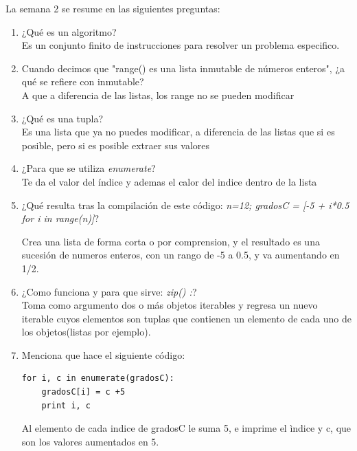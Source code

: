 \documentclass[letterpaper, 12pt, oneside]{article}%
\begin{document}
La semana 2 se resume en las siguientes preguntas:%
\begin{enumerate}%
	\item ¿Qué es un algoritmo? \\
	 Es un conjunto finito de instrucciones para resolver
	 un problema especifico.
	
	\item Cuando decimos que "range() es una lista inmutable de números enteros", ¿a qué se refiere con inmutable?\\
	A que a diferencia de las listas, los range no se pueden modificar
	\item ¿Qué es una tupla?\\
	Es una lista que ya no puedes modificar, a diferencia de las listas que si es posible, pero si es posible extraer sus valores
	
	\item ¿Para que se utiliza {\textit{enumerate}}?\\
	Te da el valor del índice y ademas el calor del indice dentro de la lista
	
	\item ¿Qué resulta tras la compilación de este código: {\textit{n=12; gradosC = [-5 + i*0.5 for i in range(n)]}}?
	
	Crea una lista de forma corta o por comprension, y el resultado es una sucesión de numeros enteros, con un rango de -5 a 0.5, y va aumentando en 1/2.
		
	
	\item ¿Como funciona y para que sirve: {\textit{zip() :}}?\\
	
	Toma como argumento dos o más objetos iterables y regresa un nuevo iterable cuyos elementos son tuplas que contienen un elemento de cada uno de los objetos(listas por ejemplo).
	
	
	\item Menciona que hace el siguiente código: \begin{verbatim}
for i, c in enumerate(gradosC):
    gradosC[i] = c +5
    print i, c
	\end{verbatim}
	Al elemento de cada indice de gradosC le suma 5, e imprime el ìndice y c, que son los valores aumentados en 5.
	
	 
	
	
	
	
	
\end{enumerate}%
\end{document}
